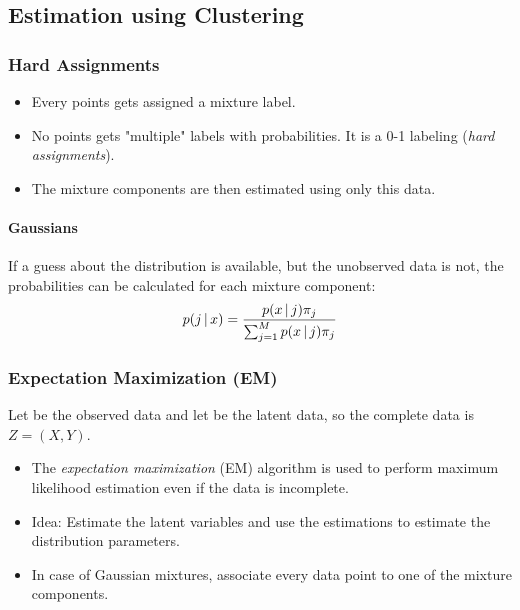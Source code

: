 		\subsection{Estimation using Clustering}
			\subsubsection{Hard Assignments}
				\begin{itemize}
					\item Every points gets assigned a mixture label.
					\item No points gets "multiple" labels with probabilities. It is a 0-1 labeling (\emph{hard assignments}).
					\item The mixture components are then estimated using only this data.
				\end{itemize}

				\paragraph{Gaussians}
					If a guess about the distribution is available, but the unobserved data is not, the probabilities can be calculated for each mixture component:
					\begin{equation}
						p(j \,\vert\, x) = \frac{p(x \,\vert\, j) \pi_j}{\sum_{j = 1}^{M} p(x \,\vert\, j) \pi_j}
					\end{equation}

			\subsubsection{Expectation Maximization (EM)} %
				Let  be the observed data and let  be the latent data, so the complete data is \( Z = (X, Y) \).
				\begin{itemize}
					\item The \emph{expectation maximization} (EM) algorithm is used to perform maximum likelihood estimation even if the data is incomplete.
					\item Idea: Estimate the latent variables and use the estimations to estimate the distribution parameters.
					\item In case of Gaussian mixtures, associate every data point to one of the mixture components.
				\end{itemize}

